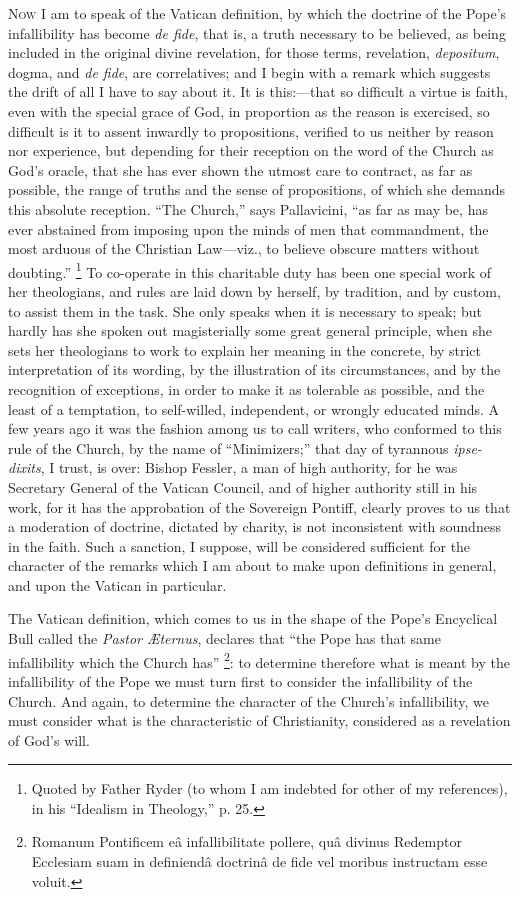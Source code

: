 N\textsc{ow} I am to speak of the Vatican definition, by which the
doctrine of the Pope's infallibility has become \emph{de fide}, that is,
a truth necessary to be believed, as being included in the original
divine revelation, for those terms, revelation, \emph{depositum}, dogma,
and \emph{de fide}, are correlatives; and I begin with a remark which
suggests the drift of all I have to say about it. It is this:—that so
difficult a virtue is faith, even with the special grace of God, in
proportion as the reason is exercised, so difficult is it to assent
inwardly to propositions, verified to us neither by reason nor
experience, but depending for their reception on the word of the Church
as God's oracle, that she has ever shown the utmost care to contract, as
far as possible, the range of truths and the sense of propositions, of
which she demands this absolute reception. ``The Church,'' says
Pallavicini, ``as far as may be, has ever abstained from imposing
upon the minds of men that commandment, the most arduous of the
Christian Law—viz., to believe obscure matters without doubting.''
\footnote{Quoted by Father Ryder (to whom I am indebted for other of my
references), in his ``Idealism in Theology,'' p. 25.} To co-operate in this charitable duty has been one special work
of her theologians, and rules are laid down by herself, by tradition, and by custom, to assist them in the task. She only speaks
when it is necessary to speak; but hardly has she spoken out
magisterially some great general principle, when she sets her
theologians to work to explain her meaning in the concrete, by strict
interpretation of its wording, by the illustration of its circumstances,
and by the recognition of exceptions, in order to make it as tolerable
as possible, and the least of a temptation, to self-willed, independent,
or wrongly educated minds. A few years ago it was the fashion among us
to call writers, who conformed to this rule of the Church, by the name
of ``Minimizers;'' that day of tyrannous \emph{ipse-dixits}, I
trust, is over: Bishop Fessler, a man of high authority, for he was
Secretary General of the Vatican Council, and of higher authority still
in his work, for it has the approbation of the Sovereign Pontiff,
clearly proves to us that a moderation of doctrine, dictated by charity,
is not inconsistent with soundness in the faith. Such a sanction, I
suppose, will be considered sufficient for the character of the remarks
which I am about to make upon definitions in general, and upon the
Vatican in particular.

The Vatican definition, which comes to us in the shape of the Pope's
Encyclical Bull called the \emph{Pastor Æternus}, declares that
``the Pope has that same infallibility which the Church has'' \footnote{Romanum Pontificem eâ infallibilitate pollere, quâ divinus
Redemptor Ecclesiam suam in definiendâ doctrinâ de fide vel moribus
instructam esse voluit.}: to determine therefore what is meant by the infallibility of
the Pope we must turn first to consider the infallibility of the Church.
And again, to determine the character of the Church's
infallibility, we must consider what is the characteristic of
Christianity, considered as a revelation of God's will.

